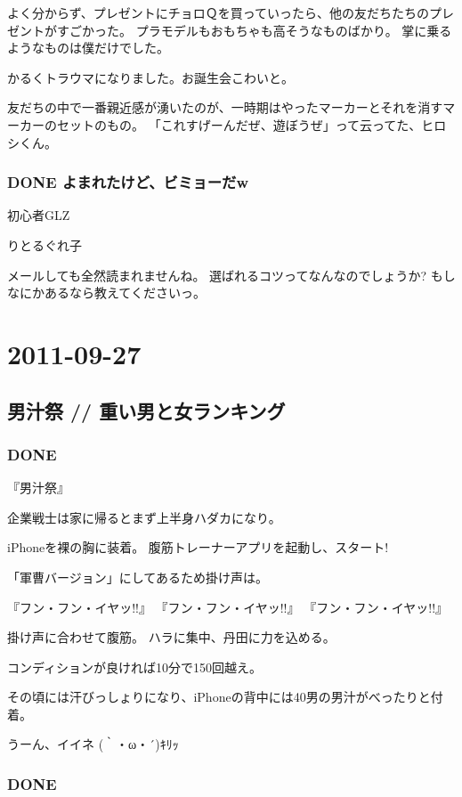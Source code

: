 \documentclass[11pt]{article}
\begin{document}
よく分からず、プレゼントにチョロＱを買っていったら、他の友だちたちのプレゼントがすごかった。
プラモデルもおもちゃも高そうなものばかり。
掌に乗るようなものは僕だけでした。

かるくトラウマになりました。お誕生会こわいと。

友だちの中で一番親近感が湧いたのが、一時期はやったマーカーとそれを消すマーカーのセットのもの。
「これすげーんだぜ、遊ぼうぜ」って云ってた、ヒロシくん。
\subsubsection{\textbf{DONE} よまれたけど、ビミョーだw}
\label{sec-64_2_3}

初心者GLZ

りとるぐれ子

メールしても全然読まれませんね。
選ばれるコツってなんなのでしょうか?
もしなにかあるなら教えてくださいっ。
\section{2011-09-27}
\label{sec-65}
\subsection{男汁祭 // 重い男と女ランキング}
\label{sec-65_1}
\subsubsection{\textbf{DONE}}
\label{sec-65_1_1}

『男汁祭』

企業戦士は家に帰るとまず上半身ハダカになり。

iPhoneを裸の胸に装着。
腹筋トレーナーアプリを起動し、スタート!

「軍曹バージョン」にしてあるため掛け声は。

『フン・フン・イヤッ!!』
  『フン・フン・イヤッ!!』
     『フン・フン・イヤッ!!』

掛け声に合わせて腹筋。
ハラに集中、丹田に力を込める。

コンディションが良ければ10分で150回越え。

その頃には汗びっしょりになり、iPhoneの背中には40男の男汁がべったりと付着。

うーん、イイネ (｀・ω・´)ｷﾘｯ
\subsubsection{\textbf{DONE}}
\label{sec-65_1_2}
\end{document}
